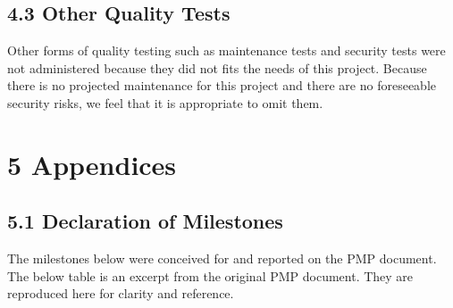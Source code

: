\documentclass[]{article}
\begin{document}
\subsection{\textbf{4.3 Other Quality Tests}}\label{other-quality-tests}

Other forms of quality testing such as maintenance tests and security
tests were not administered because they did not fits the needs of this
project. Because there is no projected maintenance for this project and
there are no foreseeable security risks, we feel that it is appropriate
to omit them.

\section{\textbf{5 Appendices }}\label{appendices}

\subsection{\textbf{5.1 Declaration of
Milestones}}\label{declaration-of-milestones}

The milestones below were conceived for and reported on the PMP
document. The below table is an excerpt from the original PMP document.
They are reproduced here for clarity and reference.
\end{document}
